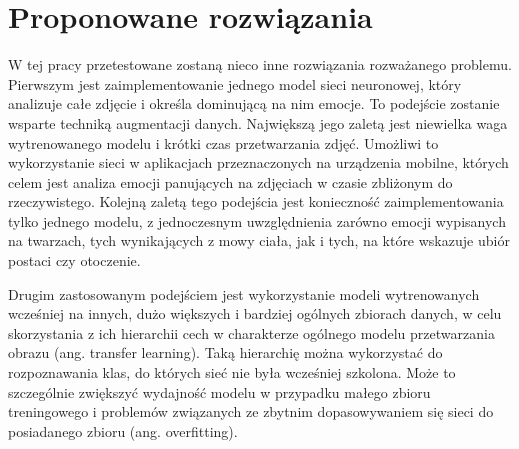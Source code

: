 \section{Proponowane rozwiązania}
W tej pracy przetestowane zostaną nieco inne rozwiązania rozważanego problemu. Pierwszym jest zaimplementowanie jednego model sieci neuronowej, który analizuje całe zdjęcie i określa dominującą na nim emocje. To podejście zostanie wsparte techniką augmentacji danych. Największą jego zaletą jest niewielka waga wytrenowanego modelu i krótki czas przetwarzania zdjęć. Umożliwi to wykorzystanie sieci w aplikacjach przeznaczonych na urządzenia mobilne, których celem jest analiza emocji panujących na zdjęciach w czasie zbliżonym do rzeczywistego. Kolejną zaletą tego podejścia jest konieczność zaimplementowania tylko jednego modelu, z jednoczesnym uwzględnienia zarówno emocji wypisanych na twarzach, tych wynikających z mowy ciała, jak i tych, na które wskazuje ubiór postaci czy otoczenie.

Drugim zastosowanym podejściem jest wykorzystanie modeli wytrenowanych wcześniej na innych, dużo większych i bardziej ogólnych zbiorach danych, w celu skorzystania z ich hierarchii cech w charakterze ogólnego modelu przetwarzania obrazu (ang. transfer learning). Taką hierarchię można wykorzystać do rozpoznawania klas, do których sieć nie była wcześniej szkolona. Może to szczególnie zwiększyć wydajność modelu w przypadku małego zbioru treningowego i problemów związanych ze zbytnim dopasowywaniem się sieci do posiadanego zbioru (ang. overfitting).

